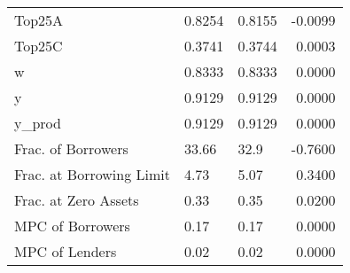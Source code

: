\begin{table}
\begin{tabular}{lllr}
                  Top25A &  0.8254 &   0.8155 & -0.0099 \\
                  Top25C &  0.3741 &   0.3744 &  0.0003 \\
                       w &  0.8333 &   0.8333 &  0.0000 \\
                       y &  0.9129 &   0.9129 &  0.0000 \\
                  y\_prod &  0.9129 &   0.9129 &  0.0000 \\
      Frac. of Borrowers &   33.66 &     32.9 & -0.7600 \\
Frac. at Borrowing Limit &    4.73 &     5.07 &  0.3400 \\
    Frac. at Zero Assets &    0.33 &     0.35 &  0.0200 \\
        MPC of Borrowers &    0.17 &     0.17 &  0.0000 \\
          MPC of Lenders &    0.02 &     0.02 &  0.0000 \\
\bottomrule
\end{tabular}
\end{table}
